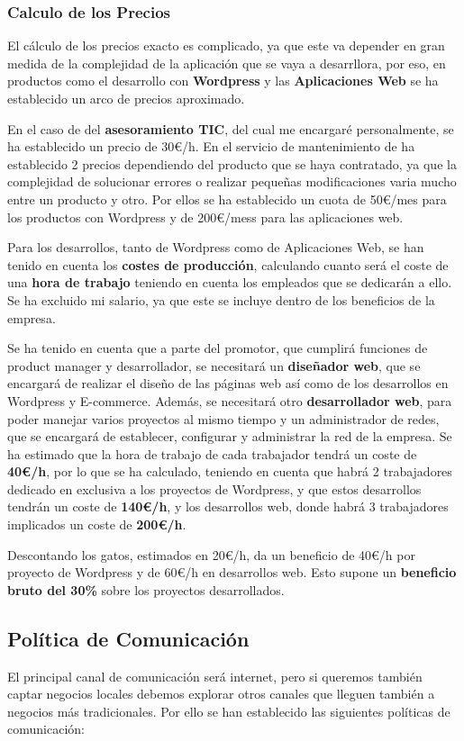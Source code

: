 \subsubsection{Calculo de los Precios}
El cálculo de los precios exacto es complicado, ya que este va depender en gran medida de la complejidad de la aplicación que se vaya a desarrllora, por eso, en productos como el desarrollo con \textbf{Wordpress} y las \textbf{Aplicaciones Web} se ha establecido un arco de precios aproximado.

En el caso de del \textbf{asesoramiento TIC}, del cual me encargaré personalmente, se ha establecido un precio de 30€/h. En el servicio de mantenimiento de ha establecido 2 precios dependiendo del producto que se haya contratado, ya que la complejidad de solucionar errores o realizar pequeñas modificaciones varia mucho entre un producto y otro. Por ellos se ha establecido un cuota de 50€/mes para los productos con Wordpress y de 200€/mess para las aplicaciones web.

Para los desarrollos, tanto de Wordpress como de Aplicaciones Web, se han tenido en cuenta los \textbf{costes de producción}, calculando cuanto será el coste de una \textbf{hora de trabajo} teniendo en cuenta los empleados que se dedicarán a ello. Se ha excluido mi salario, ya que este se incluye dentro de los beneficios de la empresa.

Se ha tenido en cuenta que a parte del promotor, que cumplirá funciones de product manager y desarrollador, se necesitará un \textbf{diseñador web}, que se encargará de realizar el diseño de las páginas web así como de los desarrollos en Wordpress y E-commerce. Además, se necesitará otro \textbf{desarrollador web}, para poder manejar varios proyectos al mismo tiempo y un administrador de redes, que se encargará de establecer, configurar y administrar la red de la empresa. Se ha estimado que la hora de trabajo de cada trabajador tendrá un coste de \textbf{40€/h}, por lo que se ha calculado, teniendo en cuenta que habrá 2 trabajadores dedicado en exclusiva a los proyectos de Wordpress, y que estos desarrollos tendrán un coste de \textbf{140€/h}, y los desarrollos web, donde habrá 3 trabajadores implicados un coste de \textbf{200€/h}.

Descontando los gatos, estimados en 20€/h, da un beneficio de 40€/h por proyecto de Wordpress y de  60€/h en desarrollos web. Esto supone un \textbf{beneficio bruto del 30\%} sobre los proyectos desarrollados.


\subsection{Política de Comunicación}
\label{sec:publi}
El principal canal de comunicación será internet, pero si queremos también captar negocios locales debemos explorar otros canales que lleguen también a negocios más tradicionales. Por ello se han establecido las siguientes políticas de comunicación:

